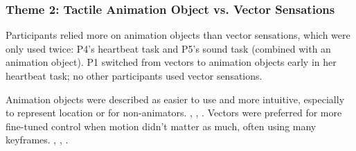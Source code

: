 \subsubsection{Theme 2: Tactile Animation Object vs. Vector Sensations}
Participants relied more on animation objects %
than vector sensations, which
were only used twice: P4's heartbeat task and P5's sound task (combined with an animation object).
P1 switched from vectors to animation objects early in her heartbeat task;
no other participants used vector sensations.


Animation objects were described as easier to use and more intuitive, especially to represent location or for non-animators. , 
, 
.
%
Vectors were preferred for more fine-tuned control when motion didn't matter as much, often using many keyframes.
,
, 
.

%
%
%
%
%
%


